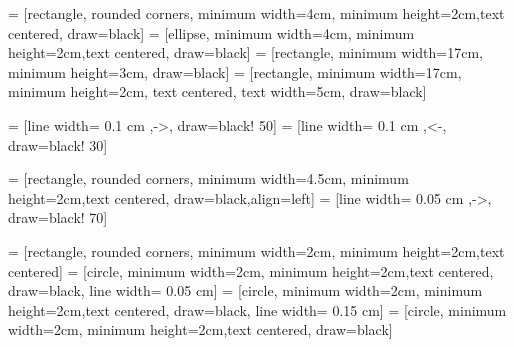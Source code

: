 \newcommand{\appref}[1]{Appendix~\ref{#1}}
\newcommand{\fnref}[1]{Footnote~\ref{#1}} 
\setcounter{tocdepth}{5}

\newenvironment{langscibars}{\begin{axis}[ybar,xtick=data, xticklabels from table={\mydata}{pos}, 
        width  = \textwidth,
	height = .3\textheight,
    	nodes near coords, 
	xtick=data,
	x tick label style={},  
	ymin=0,
	cycle list name=langscicolors
        ]}{\end{axis}}
        
\newcommand{\langscibar}[1]{\addplot+ table [x=i, y=#1] {\mydata};\addlegendentry{#1};}

\newcommand{\langscidata}[1]{\pgfplotstableread{#1}\mydata;}



\newcommand\Umbruch[2][3cm]{\begin{varwidth}{#1}\centering#2   \end{varwidth}}

\newcommand{\prefix}[1]{\textit{#1\hbox{-}}}
\newcommand{\suffix}[1]{\textit{\hbox{-}#1}}
\newcommand{\newterm}[1]{\textsc{#1}}


 = [rectangle, rounded corners, minimum width=4cm, minimum height=2cm,text centered, draw=black]
 = [ellipse, minimum width=4cm, minimum height=2cm,text centered, draw=black]
 = [rectangle, minimum width=17cm, minimum height=3cm, draw=black] %
 = [rectangle, minimum width=17cm, minimum height=2cm, text centered, text width=5cm, draw=black]

 = [line width= 0.1 cm ,->, draw=black! 50]
 = [line width= 0.1 cm ,<-, draw=black! 30]



 = [rectangle, rounded corners, minimum width=4.5cm, minimum height=2cm,text centered, draw=black,align=left] %
 = [line width= 0.05 cm ,->, draw=black! 70]



 = [rectangle, rounded corners, minimum width=2cm, minimum height=2cm,text centered]
 = [circle, minimum width=2cm, minimum height=2cm,text centered, draw=black, line width= 0.05 cm]
 = [circle, minimum width=2cm, minimum height=2cm,text centered, draw=black, line width= 0.15 cm]
 = [circle, minimum width=2cm, minimum height=2cm,text centered, draw=black]

